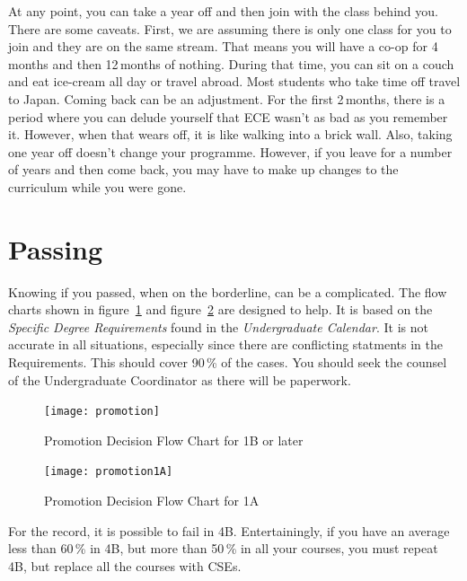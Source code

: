 \documentclass{book}
\begin{document}
At any point, you can take a year off and then join with the class behind you. There are some caveats. First, we are assuming there is only one class for you to join and they are on the same stream. That means you will have a co-op for 4\,months and then 12\,months of nothing. During that time, you can sit on a couch and eat ice-cream all day or travel abroad. Most students who take time off travel to Japan. Coming back can be an adjustment. For the first 2\,months, there is a period where you can delude yourself that ECE wasn't as bad as you remember it. However, when that wears off, it is like walking into a brick wall. Also, taking one year off doesn't change your programme. However, if you leave for a number of years and then come back, you may have to make up changes to the curriculum while you were gone.

\section{Passing}
Knowing if you passed, when on the borderline, can be a complicated. The flow charts shown in figure~\ref{fig:promotion} and figure~\ref{fig:promotion1A} are designed to help. It is based on the \textsl{Specific Degree Requirements} found in the \textsl{Undergraduate Calendar}. It is not accurate in all situations, especially since there are conflicting statments in the Requirements. This should cover 90\,\% of the cases. You should seek the counsel of the Undergraduate Coordinator as there will be paperwork.

\begin{figure}
\begin{center}
\texttt{[image: promotion]}
\end{center}
\caption{\label{fig:promotion}Promotion Decision Flow Chart for 1B or later}
\end{figure}

\begin{figure}
\begin{center}
\texttt{[image: promotion1A]}
\end{center}
\caption{\label{fig:promotion1A}Promotion Decision Flow Chart for 1A}
\end{figure}

For the record, it is possible to fail in 4B. Entertainingly, if you have an average less than 60\,\% in 4B, but more than 50\,\% in all your courses, you must repeat 4B, but replace all the courses with CSEs.
\end{document}
